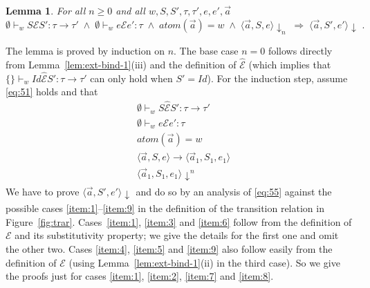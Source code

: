 \documentclass{LMCS}
\theoremstyle{plain}
\newtheorem{lemma}[thm]{Lemma}
\theoremstyle{definition}
\newcommand{\atoms}{\mathit{atom}}
\newcommand{\config}[3]{\langle#1, #2, #3\rangle}
\renewcommand{\conj}{\wedge}
\newcommand{\CR}[1]{\mathrel{\widehat{#1}}}
\newcommand{\ent}{\vdash}
\newcommand{\er}{\mathrel{\mathcal{E}}}
\newcommand{\es}{\mathit{Id}}
\renewcommand{\exp}[1][e]{#1}
\newcommand{\FUNTY}{\mathbin{\rightarrow}}
\newcommand{\imp}{\Rightarrow}
\newcommand{\ofty}{:}
\newcommand{\s}[1][a]{\vec{#1}}
\newcommand{\stk}[1][S]{#1}
\newcommand{\terminates}[1][]{{\downarrow_{#1}}}
\newcommand{\trans}{\longrightarrow}
\newcommand{\ty}{\tau}
\newcommand{\w}[1][w]{#1}
\begin{document}
\begin{lemma}
  \label{lem:ext-bind-3}
  For all $n\geq 0$ and all $\w,\stk,\stk',\ty,\ty',\exp,\exp',\s$
  \begin{equation}
    \label{eq:51}
    \emptyset\ent_{\w} \stk \CR{\er} \stk' \ofty \ty\FUNTY\ty'
    \;\conj\; \emptyset\ent_{\w}\exp\er\exp'\ofty\ty \;\conj\;
    \atoms(\s)=\w \;\conj\;
    \config{\s}{\stk}{\exp}\terminates[n]
    \;\imp\; \config{\s}{\stk'}{\exp'}\terminates\;.
  \end{equation}
\end{lemma}
\proof
  The lemma is proved by induction on $n$. The base case $n=0$ follows
  directly from Lemma~\ref{lem:ext-bind-1}(iii) and the definition of
  $\CR{\er}$ (which implies that
  $\{\}\ent_{\w}\es\CR{\er}\stk'\ofty\ty\FUNTY\ty'$ can only hold when
  $\stk'=\es$). For the induction step, assume \eqref{eq:51} holds and
  that
  \begin{align}
    &\emptyset\ent_{\w} \stk\CR{\er}\stk'\ofty\ty\FUNTY\ty'\label{eq:53}\\
    &\emptyset\ent_{\w} \exp \er \exp'\ofty\ty\label{eq:54}\\
    &\atoms(\s) = \w\label{eq:52}\\
    &\config{\s}{\stk}{\exp}\trans\config{\s_1}{\stk_1}{\exp_1}\label{eq:55}\\
    &\config{\s_1}{\stk_1}{\exp_1}\terminates^n\label{eq:56}
  \end{align}
  We have to prove $\config{\s}{\stk'}{\exp'}\terminates$ and do so by
  an analysis of \eqref{eq:55} against the possible cases
  \ref{item:1}--\ref{item:9} in the definition of the transition
  relation in Figure~\ref{fig:trar}. Cases~\ref{item:1}, \ref{item:3}
  and \ref{item:6} follow from the definition of $\er$ and its
  substitutivity property; we give the details for the first one and
  omit the other two. Cases \ref{item:4}, \ref{item:5} and
  \ref{item:9} also follow easily from the definition of $\er$ (using
  Lemma~\ref{lem:ext-bind-1}(ii) in the third case). So we give the
  proofs just for cases \ref{item:1}, \ref{item:2}, \ref{item:7} and
  \ref{item:8}.
\end{document}
